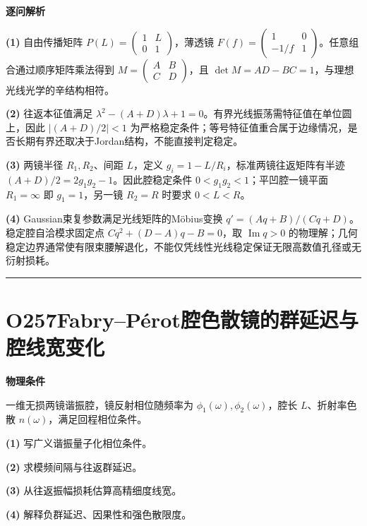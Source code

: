 \documentclass[UTF8,a4paper,11pt,oneside,openany]{ctexbook}
\begin{document}
\par\medskip\noindent\textbf{逐问解析}
\par\noindent\textbf{(1)} 自由传播矩阵 \(P(L)=\begin{pmatrix}1&L\\0&1\end{pmatrix}\)，薄透镜 \(F(f)=\begin{pmatrix}1&0\\-1/f&1\end{pmatrix}\)。任意组合通过顺序矩阵乘法得到 \(M=\begin{pmatrix}A&B\\C&D\end{pmatrix}\)，且 \(\det M=AD-BC=1\)，与理想光线光学的辛结构相符。
\par\noindent\textbf{(2)} 往返本征值满足 \(\lambda^2-(A+D)\lambda+1=0\)。有界光线振荡需特征值在单位圆上，因此 \(|(A+D)/2|<1\) 为严格稳定条件；等号特征值重合属于边缘情况，是否长期有界还取决于Jordan结构，不能直接判定稳定。
\par\noindent\textbf{(3)} 两镜半径 \(R_1,R_2\)、间距 \(L\)，定义 \(g_i=1-L/R_i\)，标准两镜往返矩阵有半迹 \((A+D)/2=2g_1g_2-1\)。因此腔稳定条件 \(0<g_1g_2<1\)；平凹腔一镜平面 \(R_1=\infty\) 即 \(g_1=1\)，另一镜 \(R_2=R\) 时要求 \(0<L<R\)。
\par\noindent\textbf{(4)} Gaussian束复参数满足光线矩阵的Möbius变换 \(q'=(Aq+B)/(Cq+D)\)。稳定腔自洽模求固定点 \(Cq^2+(D-A)q-B=0\)，取 \(\operatorname{Im}q>0\) 的物理解；几何稳定边界通常使有限束腰解退化，不能仅凭线性光线稳定保证无限高数值孔径或无衍射损耗。

\par\bigskip\hrule\bigskip
\section*{O257\quad Fabry–Pérot腔色散镜的群延迟与腔线宽变化}
\textbf{物理条件}\par 一维无损两镜谐振腔，镜反射相位随频率为 \(\phi_1(\omega),\phi_2(\omega)\)，腔长 \(L\)、折射率色散 \(n(\omega)\)，满足回程相位条件。
\par\noindent\textbf{(1)} 写广义谐振量子化相位条件。
\par\noindent\textbf{(2)} 求模频间隔与往返群延迟。
\par\noindent\textbf{(3)} 从往返振幅损耗估算高精细度线宽。
\par\noindent\textbf{(4)} 解释负群延迟、因果性和强色散限度。
\end{document}
